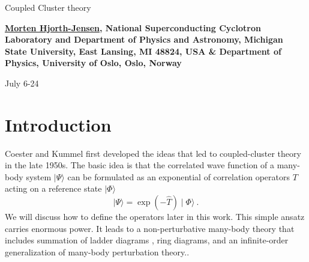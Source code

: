\documentclass[%
oneside,                 %
final,                   %
10pt]{article}
\begin{document}






\thispagestyle{empty}

\begin{center}
{\LARGE\bf
\begin{spacing}{1.25}
Coupled Cluster theory
\end{spacing}
}
\end{center}


\begin{center}
{\bf \href{{http://computationalphysics.no}}{Morten Hjorth-Jensen}, National Superconducting Cyclotron Laboratory and Department of Physics and Astronomy, Michigan State University, East Lansing, MI 48824, USA {\&} Department of Physics, University of Oslo, Oslo, Norway${}^{}$} \\ [0mm]
\end{center}

\begin{center}
\end{center}
    

\begin{center} %
July 6-24
\end{center}

\vspace{1cm}


\section*{Introduction}
Coester and Kummel first developed the ideas that led to coupled-cluster
theory in the late 1950s. The basic idea is that the correlated wave function
of a many-body system $\mid\Psi\rangle$
can be formulated as an exponential of correlation
operators $T$ acting on a reference state $\mid\Phi\rangle$
\[
\mid\Psi\rangle = \exp\left(-\hat{T}\right)\mid\Phi\rangle\ .
\]
We will discuss how to define the operators later in this work. This simple
ansatz carries enormous power. It leads to a non-perturbative many-body
theory that includes summation of ladder diagrams , ring
diagrams, and an infinite-order
generalization of many-body perturbation theory..
\end{document}
